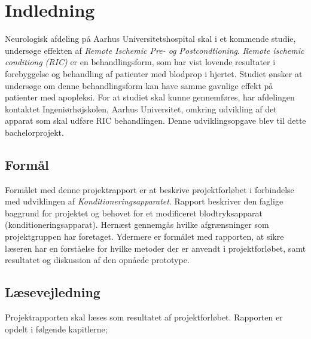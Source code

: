 \chapter{Indledning}
Neurologisk afdeling på Aarhus Universitetshospital skal i et kommende studie, undersøge effekten af \textit{Remote Ischemic Pre- og Postcondtioning}. \textit{Remote ischemic conditiong (RIC)} er en behandlingsform, som har vist lovende resultater i forebyggelse og behandling af patienter med blodprop i hjertet. Studiet ønsker at undersøge om denne behandlingsform kan have samme gavnlige effekt på patienter med apopleksi. For at studiet skal kunne gennemføres, har afdelingen kontaktet Ingeniørhøjskolen, Aarhus Universitet, omkring udvikling af det apparat som skal udføre RIC behandlingen. Denne udviklingsopgave blev til dette bachelorprojekt. 

\section{Formål}
Formålet med denne projektrapport er at beskrive projektforløbet i forbindelse med udviklingen af \textit{Konditioneringsapparatet}. Rapport beskriver den faglige baggrund for projektet og behovet for et modificeret blodtryksapparat (konditioneringsapparat). Hernæst gennemgås hvilke afgrænsninger som projektgruppen har foretaget. Ydermere er formålet med rapporten, at sikre læseren har en forståelse for hvilke metoder der er anvendt i projektforløbet, samt resultatet og diskussion af den opnåede prototype. 

\section{Læsevejledning}
Projektrapporten skal læses som resultatet af projektforløbet. Rapporten er opdelt i følgende kapitlerne;

